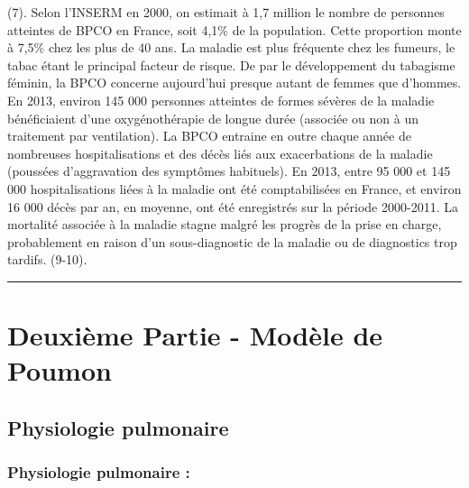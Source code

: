 \documentclass[12pt,]{article}
\begin{document}
(7). Selon l'INSERM en 2000, on estimait à 1,7 million le nombre de
personnes atteintes de BPCO en France, soit 4,1\% de la population.
Cette proportion monte à 7,5\% chez les plus de 40 ans. La maladie est
plus fréquente chez les fumeurs, le tabac étant le principal facteur de
risque. De par le développement du tabagisme féminin, la BPCO concerne
aujourd'hui presque autant de femmes que d'hommes. En 2013, environ 145
000 personnes atteintes de formes sévères de la maladie bénéficiaient
d'une oxygénothérapie de longue durée (associée ou non à un traitement
par ventilation). La BPCO entraine en outre chaque année de nombreuses
hospitalisations et des décès liés aux exacerbations de la maladie
(poussées d'aggravation des symptômes habituels). En 2013, entre 95 000
et 145 000 hospitalisations liées à la maladie ont été comptabilisées en
France, et environ 16 000 décès par an, en moyenne, ont été enregistrés
sur la période 2000-2011. La mortalité associée à la maladie stagne
malgré les progrès de la prise en charge, probablement en raison d'un
sous-diagnostic de la maladie ou de diagnostics trop tardifs. (9-10).

\pagebreak

\begin{center}\rule{0.5\linewidth}{\linethickness}\end{center}

\hypertarget{deuxieme-partie---modele-de-poumon}{%
\section{Deuxième Partie - Modèle de
Poumon}\label{deuxieme-partie---modele-de-poumon}}

\hypertarget{physiologie-pulmonaire}{%
\subsection{Physiologie pulmonaire}\label{physiologie-pulmonaire}}

\hypertarget{physiologie-pulmonaire-1}{%
\subsubsection{Physiologie pulmonaire
:}\label{physiologie-pulmonaire-1}}
\end{document}

